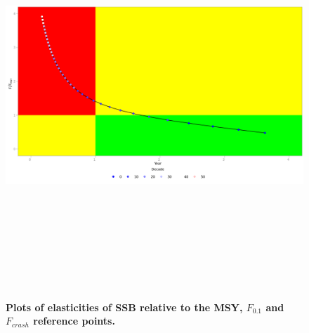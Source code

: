\documentclass[10pt]{article}
\begin{document}
\begin{figure}[!ht]
\begin{center}
\includegraphics[height=6in, width=6in]{fig4.png}
\end{center}
\caption{\bf{Plots of elasticities of SSB relative to the MSY, $F_{0.1}$ and $F_{crash}$ reference points.}}
\label{fig:elasssb}
\end{figure}
\end{document}
